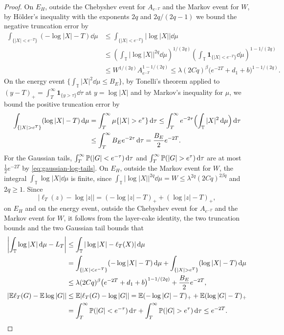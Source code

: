 \begin{proof}
On $E_H$, outside the Chebyshev event for $A_{e^{-T}}$ and the Markov
event for $W$, by H\"older's inequality with the exponents $2q$ and
$2q/(2q-1)$ we bound the negative truncation error by
\begin{align*}
 \int_{\{|X|<e^{-T}\}}(-\log|X|-T)\dd\mu
 &\leq\int_{\{|X|<e^{-T}\}}|\log|X||\dd\mu\\
 &\leq\left(\int_{\mathbb T}|\log|X||^{2q}\dd\mu\right)^{1/(2q)}
       \left(\int_{\mathbb T}
         \boldsymbol1_{\{|X|<e^{-T}\}}\dd\mu\right)^{1-1/(2q)}\\
 &\leq W^{1/(2q)}A_{e^{-T}}^{1-1/(2q)}
 \leq\lambda(2Cq)^\beta\bigl(e^{-2T}+d_1+b\bigr)^{1-1/(2q)}.
\end{align*}
On the energy event $\{\int_{\mathbb T}|X|^2\dd\mu\leq B_E\}$, by
Tonelli's theorem applied to
$(y-T)_+=\int_T^\infty\boldsymbol1_{\{y>\tau\}}\dd\tau$ at $y=\log|X|$
and by Markov's inequality for $\mu$, we bound the positive truncation
error by
\begin{align*}
 \int_{\{|X|>e^T\}}(\log|X|-T)\dd\mu
 &=\int_T^\infty\mu\{|X|>e^\tau\}\dd\tau
 \leq\int_T^\infty e^{-2\tau}\Bigl(\int_{\mathbb T}|X|^2\dd\mu\Bigr)\dd\tau\\
 &\leq\int_T^\infty B_E e^{-2\tau}\dd\tau
 =\frac{B_E}2e^{-2T}.
\end{align*}
For the Gaussian tails,
$\int_T^\infty\mathbb P(|G|<e^{-\tau})\,\mathrm d\tau$ and
$\int_T^\infty\Prob(|G|>e^\tau)\dd\tau$ are at most
$\frac12e^{-2T}$ by \eqref{eq:gaussian-log-tails}.
On $E_H$, outside the Markov event for $W$, the integral
$\int_{\mathbb T}\log|X|\dd\mu$ is finite, since
$\int_{\mathbb T}|\log|X||^{2q}\dd\mu=W\leq\lambda^{2q}(2Cq)^{2\beta q}$
and $2q\ge1$. Since
\[
 |\ell_T(z)-\log|z||=(-\log|z|-T)_++(\log|z|-T)_+,
\]
on $E_H$ and on the energy event, outside the Chebyshev event for
$A_{e^{-T}}$ and the Markov event for $W$, it follows from the layer-cake
identity, the two truncation bounds and the two Gaussian tail bounds that
\begin{align*}
 \left|\int_{\mathbb T}\log|X|\dd\mu-L_T\right|
 &\leq\int_{\mathbb T}|\log|X|-\ell_T(X)|\dd\mu\\
 &=\int_{\{|X|<e^{-T}\}}(-\log|X|-T)\dd\mu
      +\int_{\{|X|>e^T\}}(\log|X|-T)\dd\mu\\
 &\leq\lambda(2Cq)^\beta\bigl(e^{-2T}+d_1+b\bigr)^{1-1/(2q)}
       +\frac{B_E}2e^{-2T},\\
 |\E\ell_T(G)-\E\log|G||
 &\leq\E|\ell_T(G)-\log|G||
 =\E(-\log|G|-T)_++\E(\log|G|-T)_+\\
 &=\int_T^\infty\Prob(|G|<e^{-\tau})\dd\tau
       +\int_T^\infty\Prob(|G|>e^\tau)\dd\tau
 \leq e^{-2T}.
\end{align*}


\end{proof}
